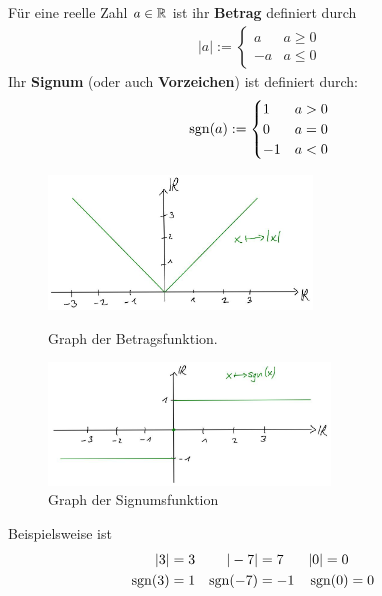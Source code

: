 \begin{defin}  
    Für eine reelle Zahl $a\in \mathbb R$ ist ihr \textbf{Betrag} definiert durch 
    \begin{align*}
        |a|:= \begin{cases}
            a&a\ge 0\\
            -a&a \le 0
        \end{cases}
    \end{align*}
    Ihr \textbf{Signum} (oder auch \textbf{Vorzeichen}) ist definiert durch:
    \begin{align*}
        \operatorname{sgn}(a) := \begin{cases}
            1 & a>0 \\
            0 & a=0 \\
            -1 & a<0
        \end{cases}
    \end{align*} 
    \begin{figure}[ht]
    \begin{minipage}{.48\textwidth}
        \includegraphics[width=7cm]{./_img/Betrag.jpeg}
        \centering \caption{Graph der Betragsfunktion.}
    \end{minipage}
    \quad
    \begin{minipage}{.48\textwidth}
        \includegraphics[width=7.5cm]{./_img/Signum.jpeg}
        \centering \caption{Graph der Signumsfunktion}
    \end{minipage}
    \end{figure}
\end{defin}


\begin{bsp}
    Beispielsweise ist
    \begin{align*}
        \vert 3\vert &= 3 & \vert -7\vert &=7 & \vert 0\vert=0 \\
        \operatorname{sgn}(3) & = 1 & \operatorname{sgn}(-7) & = -1 & \operatorname{sgn}(0) & = 0
    \end{align*}
\end{bsp}


